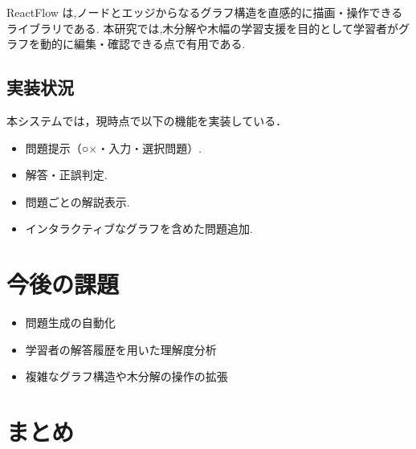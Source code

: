 \documentclass[paper]{ieicej}
\begin{document}
ReactFlow\cite{reactflow} は,ノードとエッジからなるグラフ構造を直感的に描画・操作できるライブラリである.
本研究では,木分解や木幅の学習支援を目的として学習者がグラフを動的に編集・確認できる点で有用である.

\subsection{実装状況}
本システムでは，現時点で以下の機能を実装している．
\begin{itemize}
  \item 問題提示（○×・入力・選択問題）.
  \item 解答・正誤判定.
  \item 問題ごとの解説表示.
  \item インタラクティブなグラフを含めた問題追加.
\end{itemize}

\section{今後の課題}
\begin{itemize}
  \item 問題生成の自動化
  \item 学習者の解答履歴を用いた理解度分析
  \item 複雑なグラフ構造や木分解の操作の拡張
\end{itemize}


\section{まとめ}

\ack %




\appendix
\section{}

\begin{biography}
\profile{}{}{}
\end{biography}
\end{document}
